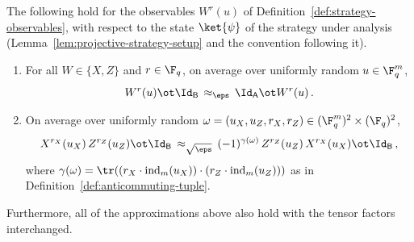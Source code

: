 \begin{lemma}
	\label{lem:qld-win-implications-obs}
	\leanok
	The following hold for the observables $W^r(u)$ of
	Definition~\ref{def:strategy-observables}, with respect to the state
	$\ket{\psi}$ of the strategy under analysis
	(Lemma~\ref{lem:projective-strategy-setup} and the convention
	following it).
	\begin{enumerate}
		\item For all $W \in \{X,Z\}$ and $r \in \F_q$, on average over
		uniformly random $u \in \F_q^m$,
		\begin{equation}\label{eq:pts-obs-consistency}
			W^r(u) \ot \Id_{\mathsf{B}} \,\approx_\eps\, \Id_{\mathsf{A}} \ot W^r(u)\,.
		\end{equation}
		\item On average over uniformly random
		$\omega = (u_X,u_Z,r_X,r_Z) \in (\F_q^m)^2 \times (\F_q)^2$,
		\begin{equation}\label{eq:pts-obs-commutation}
			X^{r_X}(u_X)\, Z^{r_Z}(u_Z) \ot \Id_{\mathsf{B}}
			\,\approx_{\sqrt{\eps}}\,
			(-1)^{\gamma(\omega)}\, Z^{r_Z}(u_Z)\, X^{r_X}(u_X) \ot \Id_{\mathsf{B}}\,,
		\end{equation}
		where
		$\gamma(\omega) = \tr((r_X \cdot \mathrm{ind}_m(u_X)) \cdot (r_Z \cdot \mathrm{ind}_m(u_Z)))$
		as in Definition~\ref{def:anticommuting-tuple}.
	\end{enumerate}
	Furthermore, all of the approximations above also hold with the tensor
	factors interchanged.
\end{lemma}
